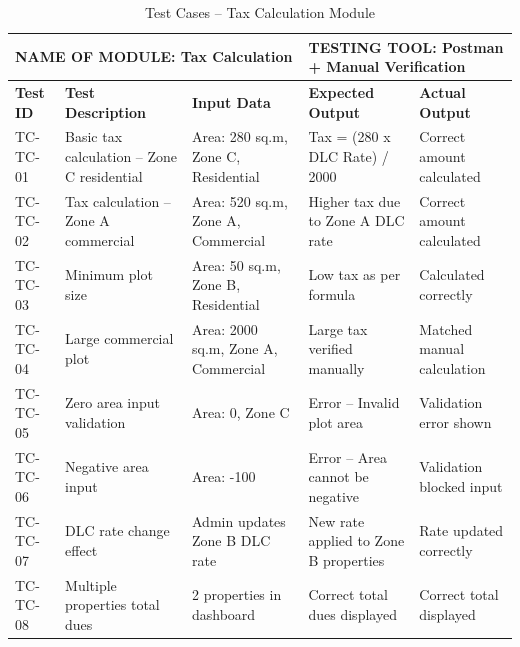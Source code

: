 \begin{table}[H]
\begin{center}
 \begin{tabular}{| m{1.2cm} | m{3.5cm} | m{2.2cm}| m{3cm}|m{3cm}| } 
\hline
\multicolumn{3}{|l|}{NAME OF MODULE: Tax Calculation}&
\multicolumn{2}{|l|}{TESTING TOOL: Postman + Manual Verification}\\[0.8cm]
\hline
\textbf{Test ID} & \textbf{Test Description} & \textbf{Input Data} & \textbf{Expected Output} & \textbf{Actual Output} \\ 
\hline
TC-TC-01 & Basic tax calculation -- Zone C residential & Area: 280 sq.m, Zone C, Residential & Tax = (280 x DLC Rate) / 2000 & Correct amount calculated \\
\hline
TC-TC-02 & Tax calculation -- Zone A commercial & Area: 520 sq.m, Zone A, Commercial & Higher tax due to Zone A DLC rate & Correct amount calculated \\
\hline
TC-TC-03 & Minimum plot size & Area: 50 sq.m, Zone B, Residential & Low tax as per formula & Calculated correctly \\
\hline
TC-TC-04 & Large commercial plot & Area: 2000 sq.m, Zone A, Commercial & Large tax verified manually & Matched manual calculation \\
\hline
TC-TC-05 & Zero area input validation & Area: 0, Zone C & Error -- Invalid plot area & Validation error shown \\
\hline
TC-TC-06 & Negative area input & Area: -100 & Error -- Area cannot be negative & Validation blocked input \\
\hline
TC-TC-07 & DLC rate change effect & Admin updates Zone B DLC rate & New rate applied to Zone B properties & Rate updated correctly \\
\hline
TC-TC-08 & Multiple properties total dues & 2 properties in dashboard & Correct total dues displayed & Correct total displayed \\
\hline
\end{tabular}
\caption{Test Cases -- Tax Calculation Module}
\end{center}
\end{table}

